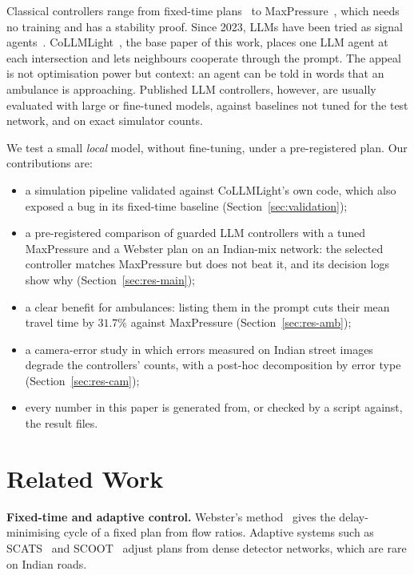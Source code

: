 \documentclass[conference]{IEEEtran}
\newcommand{\V}[2]{\ensuremath{#2}}
\begin{document}
Classical controllers range from fixed-time plans~\cite{webster1958} to
MaxPressure~\cite{varaiya2013maxpressure}, which needs no training and has a stability proof.
Since 2023, LLMs have been tried as signal agents~\cite{lai2023llmlight,wang2024lalight}.
CoLLMLight~\cite{yuan2026collmlight}, the base paper of this work, places one LLM agent at each
intersection and lets neighbours cooperate through the prompt. The appeal is not optimisation
power but context: an agent can be told in words that an ambulance is approaching. Published
LLM controllers, however, are usually evaluated with large or fine-tuned models, against
baselines not tuned for the test network, and on exact simulator counts.

We test a small \emph{local} model, without fine-tuning, under a pre-registered plan. Our
contributions are:
\begin{itemize}
\item a simulation pipeline validated against CoLLMLight's own code, which also exposed a bug
  in its fixed-time baseline (Section~\ref{sec:validation});
\item a pre-registered comparison of guarded LLM controllers with a tuned MaxPressure and a
  Webster plan on an Indian-mix network: the selected controller matches MaxPressure but does
  not beat it, and its decision logs show why (Section~\ref{sec:res-main});
\item a clear benefit for ambulances: listing them in the prompt cuts their mean travel time
  by \V{e.llm.amb_cut_vs_mp}{31.7}\% against MaxPressure (Section~\ref{sec:res-amb});
\item a camera-error study in which errors measured on Indian street images degrade the
  controllers' counts, with a post-hoc decomposition by error type (Section~\ref{sec:res-cam});
\item every number in this paper is generated from, or checked by a script against, the
  result files.
\end{itemize}

\section{Related Work}

\textbf{Fixed-time and adaptive control.} Webster's method~\cite{webster1958} gives the
delay-minimising cycle of a fixed plan from flow ratios. Adaptive systems such as
SCATS~\cite{sims1980scat} and SCOOT~\cite{hunt1981scoot} adjust plans from dense detector
networks, which are rare on Indian roads.
\end{document}
